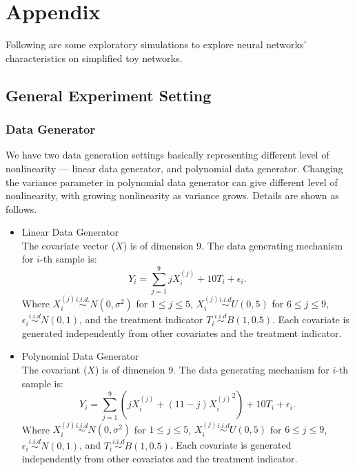 \documentclass[11pt,paper=letter]{scrartcl}
\begin{document}
\section{Appendix}

Following are some exploratory simulations to explore neural networks' characteristics on simplified toy networks. 
\subsection{General Experiment Setting}
\subsubsection{Data Generator}
We have two data generation settings basically representing different level of nonlinearity --- linear data generator, and polynomial data generator. Changing the variance parameter in polynomial data generator can give different level of nonlinearity, with growing nonlinearity as variance grows. Details are shown as follows.
\begin{itemize}
\item Linear Data Generator\\
	The covariate vector ($X$) is of dimension 9. The data generating mechanism for $i$-th sample is:
	$$Y_i = \sum_{j=1}^9 jX_i^{(j)} + 10 T_i + \epsilon_i .$$
	Where $X_i^{(j)} \overset{i.i.d.}{\sim} N(0,\sigma^2)$ for $1 \le j\le5 $, $X_i^{(j)} \overset{i.i.d}{\sim} U(0,5)$ for $6 \le j\le 9 $, $\epsilon_i \overset{i.i.d}{\sim} N(0,1)$, and the treatment indicator $T_i \overset{i.i.d}{\sim} B(1,0.5)$. Each covariate is generated independently from other covariates and the treatment indicator.
\item Polynomial Data Generator\\
	The covariant ($X$) is of dimension 9. The data generating mechanism for $i$-th sample is:
	$$ Y_i= \sum_{j=1}^9 (jX_i^{(j)}+(11-j){X_i^{(j)}}^2) + 10 T_i +\epsilon_i . $$
	Where $X_i^{(j)} \overset{i.i.d}{\sim}N(0,\sigma^2) $ for $1 \le j\le5 $, $X_i^{(j)} \overset{i.i.d}{\sim} U(0,5)$ for $6 \le j\le 9 $, $\epsilon_i \overset{i.i.d}{\sim} N(0,1)$, and $T_i \overset{i.i.d}{\sim} B(1,0.5)$. Each covariate is generated independently from other covariates and the treatment indicator.
\end{itemize}

\end{document}

